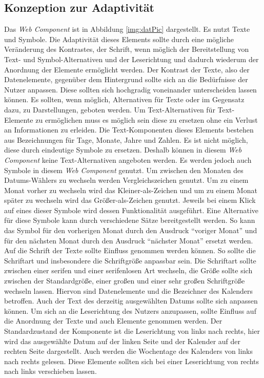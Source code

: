 \documentclass[12pt, paper=a4, bibtotoc, toc=listof, headsepline=true, numbers=endperiod]{scrreprt}
\begin{document}
		\subsection{Konzeption zur Adaptivität}
		Das \emph{Web Component} ist in Abbildung \ref{img:datPic} dargestellt. Es nutzt Texte und Symbole. Die Adaptivität dieses Elements sollte durch eine mögliche Veränderung des Kontrastes, der Schrift, wenn möglich der Bereitstellung von Text- und Symbol-Alternativen und der Leserichtung und dadurch wiederum der Anordnung der Elemente ermöglicht werden.
		\newline
		Der Kontrast der Texte, also der Datenelemente, gegenüber dem Hintergrund sollte sich an die Bedürfnisse der Nutzer anpassen. Diese sollten sich hochgradig voneinander unterscheiden lassen können. 
		Es sollten, wenn möglich, Alternativen für Texte oder im Gegensatz dazu, zu Darstellungen, geboten werden. Um Text-Alternativen für Text-Elemente zu ermöglichen muss es möglich sein diese zu ersetzen ohne ein Verlust an Informationen zu erleiden. Die Text-Komponenten dieses Elements bestehen aus Bezeichnungen für Tage, Monate, Jahre und Zahlen. Es ist nicht möglich, diese durch eindeutige Symbole zu ersetzen. Deshalb können in diesem \emph{Web Component} keine Text-Alternativen angeboten werden. Es werden jedoch auch Symbole in diesem \emph{Web Component} genutzt. Um zwischen den Monaten des Datums-Wählers zu wechseln werden Vergleichszeichen genutzt. Um zu einem Monat vorher zu wechseln wird das Kleiner-als-Zeichen und um zu einem Monat später zu wechseln wird das Größer-als-Zeichen genutzt. Jeweils bei einem Klick auf eines dieser Symbole wird dessen Funktionalität ausgeführt. Eine Alternative für diese Symbole kann durch verschiedene Sätze bereitgestellt werden. So kann das Symbol für den vorherigen Monat durch den Ausdruck \enquote{voriger Monat} und für den nächsten Monat durch den Ausdruck \enquote{nächster Monat} ersetzt werden.
		Auf die Schrift der Texte sollte Einfluss genommen werden können. So sollte die Schriftart und insbesondere die Schriftgröße anpassbar sein. Die Schriftart sollte zwischen einer serifen und einer serifenlosen Art wechseln, die Größe sollte sich zwischen der Standardgröße, einer großen und einer sehr großen Schriftgröße wechseln lassen. Hiervon sind Datenelemente und die Bezeichner des Kalenders betroffen. Auch der Text des derzeitig ausgewählten Datums sollte sich anpassen können.
		Um sich an die Leserichtung des Nutzers anzupassen, sollte Einfluss auf die Anordnung der Texte und auch Elemente genommen werden. Der Standardzustand der Komponente ist die Leserichtung von links nach rechts, hier wird das ausgewählte Datum auf der linken Seite und der Kalender auf der rechten Seite dargestellt. Auch werden die Wochentage des Kalenders von links nach rechts gelesen. Diese Elemente sollten sich bei einer Leserichtung von rechts nach links verschieben lassen.  
\end{document}
